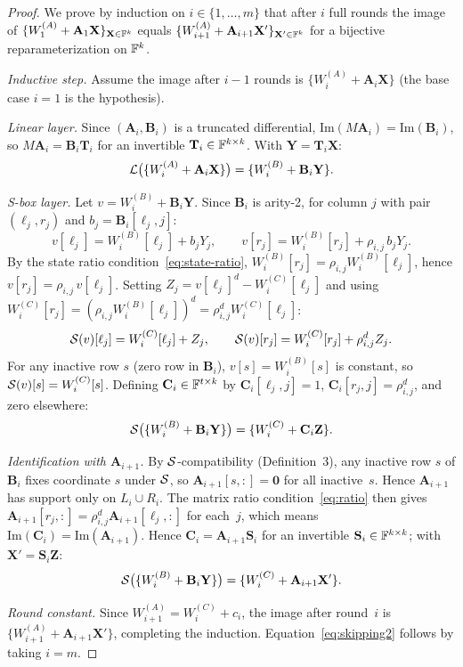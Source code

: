 \documentclass[11pt]{article}
\begin{document}
\begin{proof}
    We prove by induction on $i\in\{1,\ldots,m\}$ that after $i$ full rounds the image of
    $\{W_1^{(A)}+\mathbf{A}_1\mathbf{X}\}_{\mathbf{X}\in\mathbb{F}^k}$ equals
    $\{W_{i+1}^{(A)}+\mathbf{A}_{i+1}\mathbf{X}'\}_{\mathbf{X}'\in\mathbb{F}^k}$
    for a bijective reparameterization on $\mathbb{F}^k$.

    \textit{Inductive step.}
    Assume the image after $i-1$ rounds is $\{W_i^{(A)}+\mathbf{A}_i\mathbf{X}\}$
    (the base case $i=1$ is the hypothesis).

    \textit{Linear layer.}
    Since $(\mathbf{A}_i,\mathbf{B}_i)$ is a truncated differential,
    $\mathrm{Im}(M\mathbf{A}_i)=\mathrm{Im}(\mathbf{B}_i)$, so
    $M\mathbf{A}_i=\mathbf{B}_i\mathbf{T}_i$ for an invertible $\mathbf{T}_i\in\mathbb{F}^{k\times k}$.
    With $\mathbf{Y}=\mathbf{T}_i\mathbf{X}$:
    \[
        \mathcal{L}\bigl(\{W_i^{(A)}+\mathbf{A}_i\mathbf{X}\}\bigr)
        = \{W_i^{(B)}+\mathbf{B}_i\mathbf{Y}\}.
    \]

    \textit{S-box layer.}
    Let $v=W_i^{(B)}+\mathbf{B}_i\mathbf{Y}$.
    Since $\mathbf{B}_i$ is arity-2, for column $j$ with pair $(\ell_j,r_j)$
    and $b_j=\mathbf{B}_i[\ell_j,j]$:
    \[
        v[\ell_j]=W_i^{(B)}[\ell_j]+b_j Y_j,\qquad
        v[r_j]  =W_i^{(B)}[r_j]+\rho_{i,j}\,b_j Y_j.
    \]
    By the state ratio condition~\eqref{eq:state-ratio},
    $W_i^{(B)}[r_j]=\rho_{i,j}W_i^{(B)}[\ell_j]$, hence
    $v[r_j]=\rho_{i,j}\,v[\ell_j]$.
    Setting $Z_j=v[\ell_j]^d-W_i^{(C)}[\ell_j]$ and using
    $W_i^{(C)}[r_j]=(\rho_{i,j}W_i^{(B)}[\ell_j])^d=\rho_{i,j}^d W_i^{(C)}[\ell_j]$:
    \[
        \mathcal{S}(v)[\ell_j]=W_i^{(C)}[\ell_j]+Z_j,\qquad
        \mathcal{S}(v)[r_j]  =W_i^{(C)}[r_j]+\rho_{i,j}^d Z_j.
    \]
    For any inactive row $s$ (zero row in $\mathbf{B}_i$),
    $v[s]=W_i^{(B)}[s]$ is constant, so $\mathcal{S}(v)[s]=W_i^{(C)}[s]$.
    Defining $\mathbf{C}_i\in\mathbb{F}^{t\times k}$ by $\mathbf{C}_i[\ell_j,j]=1$,
    $\mathbf{C}_i[r_j,j]=\rho_{i,j}^d$, and zero elsewhere:
    \[
        \mathcal{S}\bigl(\{W_i^{(B)}+\mathbf{B}_i\mathbf{Y}\}\bigr)
        =\{W_i^{(C)}+\mathbf{C}_i\mathbf{Z}\}.
    \]

    \textit{Identification with $\mathbf{A}_{i+1}$.}
    By $\mathcal{S}$-compatibility (Definition~3), any inactive row $s$ of $\mathbf{B}_i$
    fixes coordinate $s$ under $\mathcal{S}$, so $\mathbf{A}_{i+1}[s,:]=\mathbf{0}$ for
    all inactive~$s$.  Hence $\mathbf{A}_{i+1}$ has support only on $L_i\cup R_i$.
    The matrix ratio condition~\eqref{eq:ratio} then gives
    $\mathbf{A}_{i+1}[r_j,:]=\rho_{i,j}^d\mathbf{A}_{i+1}[\ell_j,:]$ for each~$j$,
    which means $\mathrm{Im}(\mathbf{C}_i)=\mathrm{Im}(\mathbf{A}_{i+1})$.
    Hence $\mathbf{C}_i=\mathbf{A}_{i+1}\mathbf{S}_i$ for an invertible
    $\mathbf{S}_i\in\mathbb{F}^{k\times k}$; with $\mathbf{X}'=\mathbf{S}_i\mathbf{Z}$:
    \[
        \mathcal{S}\bigl(\{W_i^{(B)}+\mathbf{B}_i\mathbf{Y}\}\bigr)
        =\{W_i^{(C)}+\mathbf{A}_{i+1}\mathbf{X}'\}.
    \]

    \textit{Round constant.}
    Since $W_{i+1}^{(A)}=W_i^{(C)}+c_i$, the image after round~$i$ is
    $\{W_{i+1}^{(A)}+\mathbf{A}_{i+1}\mathbf{X}'\}$, completing the induction.
    Equation~\eqref{eq:skipping2} follows by taking $i=m$.
\end{proof}
\end{document}

